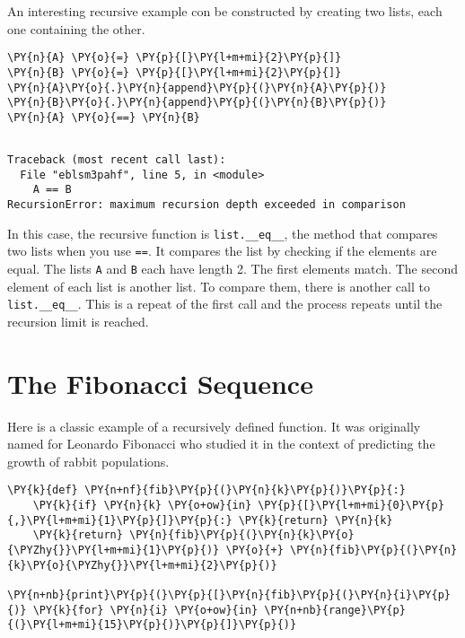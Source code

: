 An interesting recursive example con be constructed by creating two lists, each one containing the other.


\begin{Verbatim}[commandchars=\\\{\}]
\PY{n}{A} \PY{o}{=} \PY{p}{[}\PY{l+m+mi}{2}\PY{p}{]}
\PY{n}{B} \PY{o}{=} \PY{p}{[}\PY{l+m+mi}{2}\PY{p}{]}
\PY{n}{A}\PY{o}{.}\PY{n}{append}\PY{p}{(}\PY{n}{A}\PY{p}{)}
\PY{n}{B}\PY{o}{.}\PY{n}{append}\PY{p}{(}\PY{n}{B}\PY{p}{)}
\PY{n}{A} \PY{o}{==} \PY{n}{B}
\end{Verbatim}

\begin{Verbatim}

Traceback (most recent call last):
  File "eblsm3pahf", line 5, in <module>
    A == B
RecursionError: maximum recursion depth exceeded in comparison

\end{Verbatim}


In this case, the recursive function is \texttt{list.\_\_eq\_\_}, the method that compares two lists when you use \texttt{==}.  It compares the list by checking if the elements are equal.  The lists \texttt{A} and \texttt{B} each have length 2.  The first elements match.  The second element of each list is another list.  To compare them, there is another call to \texttt{list.\_\_eq\_\_}.  This is a repeat of the first call and the process repeats until the recursion limit is reached.

\section{The Fibonacci Sequence}


Here is a classic example of a recursively defined function.
It was originally named for Leonardo Fibonacci who studied it in the context of predicting the growth of rabbit populations.


\begin{Verbatim}[commandchars=\\\{\}]
\PY{k}{def} \PY{n+nf}{fib}\PY{p}{(}\PY{n}{k}\PY{p}{)}\PY{p}{:}
    \PY{k}{if} \PY{n}{k} \PY{o+ow}{in} \PY{p}{[}\PY{l+m+mi}{0}\PY{p}{,}\PY{l+m+mi}{1}\PY{p}{]}\PY{p}{:} \PY{k}{return} \PY{n}{k}
    \PY{k}{return} \PY{n}{fib}\PY{p}{(}\PY{n}{k}\PY{o}{\PYZhy{}}\PY{l+m+mi}{1}\PY{p}{)} \PY{o}{+} \PY{n}{fib}\PY{p}{(}\PY{n}{k}\PY{o}{\PYZhy{}}\PY{l+m+mi}{2}\PY{p}{)}

\PY{n+nb}{print}\PY{p}{(}\PY{p}{[}\PY{n}{fib}\PY{p}{(}\PY{n}{i}\PY{p}{)} \PY{k}{for} \PY{n}{i} \PY{o+ow}{in} \PY{n+nb}{range}\PY{p}{(}\PY{l+m+mi}{15}\PY{p}{)}\PY{p}{]}\PY{p}{)}
\end{Verbatim}

